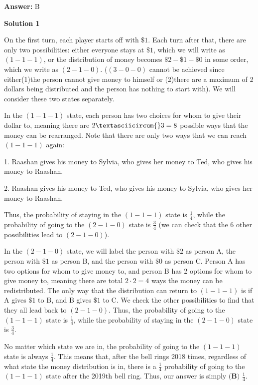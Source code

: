 \begin{enumerate}
 \textbf{Answer: }B



\textbf{Solution 1}

On the first turn, each player starts off with $\$1$. Each turn after that, there are only two possibilities: either everyone stays at $\$1$, which we will write as $(1-1-1)$, or the distribution of money becomes $\$2-\$1-\$0$ in some order, which we write as $(2-1-0)$. ($(3-0-0)$ cannot be achieved since either(1)the person cannot give money to himself or (2)there are a maximum of 2 dollars being distributed and the person has nothing to start with). We will consider these two states separately.

 In the $(1-1-1)$ state, each person has two choices for whom to give their dollar to, meaning there are $2\textasciicircum{}3=8$ possible ways that the money can be rearranged. Note that there are only two ways that we can reach $(1-1-1)$ again: 

 1. Raashan gives his money to Sylvia, who gives her money to Ted, who gives his money to Raashan.

 2. Raashan gives his money to Ted, who gives his money to Sylvia, who gives her money to Raashan.

 Thus, the probability of staying in the $(1-1-1)$ state is $\frac{1}{4}$, while the probability of going to the $(2-1-0)$ state is $\frac{3}{4}$ (we can check that the 6 other possibilities lead to $(2-1-0)$).

 
In the $(2-1-0)$ state, we will label the person with $\$2$ as person A, the person with $\$1$ as person B, and the person with $\$0$ as person C. Person A has two options for whom to give money to, and person B has 2 options for whom to give money to, meaning there are total $2\cdot 2 = 4$ ways the money can be redistributed. The only way that the distribution can return to $(1-1-1)$ is if A gives $\$1$ to B, and B gives $\$1$ to C. We check the other possibilities to find that they all lead back to $(2-1-0)$. Thus, the probability of going to the $(1-1-1)$ state is $\frac{1}{4}$, while the probability of staying in the $(2-1-0)$ state is $\frac{3}{4}$.

 No matter which state we are in, the probability of going to the $(1-1-1)$ state is always $\frac{1}{4}$. This means that, after the bell rings 2018 times, regardless of what state the money distribution is in, there is a $\frac{1}{4}$ probability of going to the $(1-1-1)$ state after the 2019th bell ring. Thus, our answer is simply $\boxed{\textbf{(B) } \frac{1}{4}}$.


\end{enumerate}
